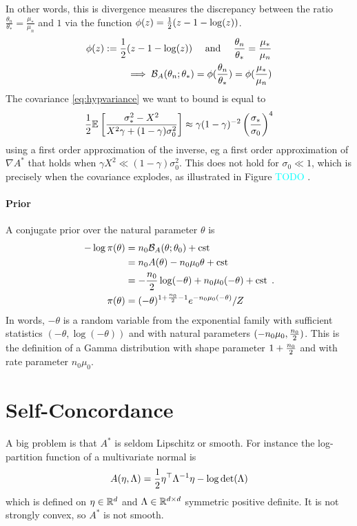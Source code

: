 \documentclass{article}
\newcommand{\TODO}[1]{\textcolor{cyan}{TODO #1}}
\newcommand*{\expect}[2][]{\ensuremath{\mathbb{E}_{#1} \left[ #2 \right] }} %
\newcommand{\logpart}{A}
\newcommand{\conj}{\logpart^*}
\newcommand{\bregman}{\cB_\logpart}
\newcommand{\natp}{\theta}
\newcommand{\lr}{\gamma} %
\begin{document}
In other words, this is divergence measures the discrepancy between the ratio $\frac{ \natp_n}{\natp_*} =  \frac{\mu_*}{ \mu_n}  $ and $1$ via the function $\phi(z)= \half (z - 1 - \log(z))$.
\begin{align}
	\phi(z) := \half (z - 1 - \log(z)) 
	\quad \text{ and } \quad
	\frac{ \natp_n}{\natp_*} =  \frac{\mu_*}{ \mu_n}  \\
	\implies \bregman( \natp_n; \natp_* )   = \phi(\frac{ \natp_n}{\natp_*}) =  \phi(\frac{\mu_*}{ \mu_n})
\end{align}
The covariance  \eqref{eq:hypvariance} we want to bound is equal to
\begin{align}
	\half \expect{\frac{\sigma_*^2 - X^2 }{ X^2 \lr + (1-\lr) \sigma_0^2 }}
	\approx \lr (1-\lr)^{-2} \left (\frac{\sigma_*}{\sigma_0} \right)^4
\end{align}
using a first order approximation of the inverse, eg a first order approximation of $\nabla \conj$ that holds when $\lr X^2 \ll (1-\lr) \sigma_0^2$. This does not hold for $\sigma_0\ll 1$, which is precisely when the covariance  explodes, as illustrated in Figure \TODO{}.

\paragraph{Prior} A conjugate prior over the natural parameter $\natp$ is 
\begin{align}
	-\log \pi(\natp)
	&= n_0 \bregman(\natp ; \natp_0) + \cst \\
	&= n_0 \logpart(\natp) - n_0\mu_0 \natp + \cst \\
	&= -\half[n_0] \log(-\natp) + n_0\mu_0 (-\natp) + \cst \; . \\
	\pi (\natp) &= (-\natp)^{1 + \half[n_0] -1 } e^{-n_0 \mu_0 (-\natp)} / Z
\end{align}
In words, $-\natp$ is a random variable from the exponential family with sufficient statistics $(-\natp, \log(-\natp))$ and with natural parameters $(-n_0 \mu_0, \half[n_0])$. This is the definition of a Gamma distribution with shape parameter $1 + \half[n_0]$ and with rate parameter $n_0 \mu_0$.

\section{Self-Concordance}

A big problem is that $\conj$ is seldom Lipschitz or smooth. For instance the log-partition function of a multivariate normal is 
\begin{align}
    \logpart(\eta, \Lambda) = \half \eta^\top \Lambda^{-1} \eta - \log\det(\Lambda)
\end{align}
which is defined on $\eta \in \real^d$ and $\Lambda\in \real^{d\times d}$ symmetric positive definite. 
It is not strongly convex, so $\conj$ is not smooth.
\end{document}
